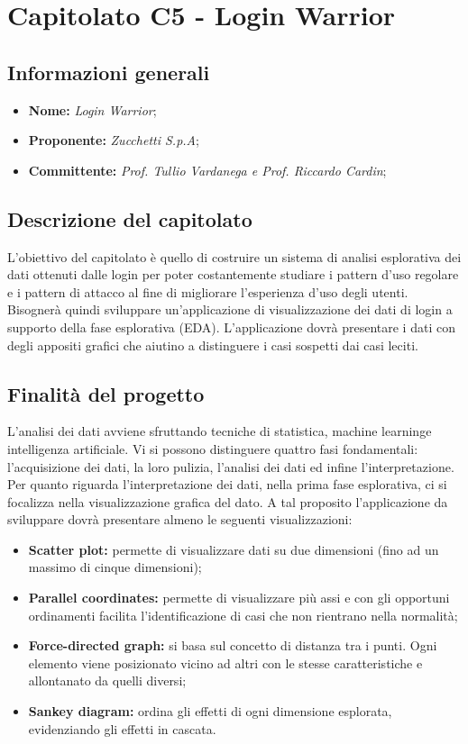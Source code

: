 \section{Capitolato C5 - Login Warrior}
\subsection{Informazioni generali}
\begin {itemize}
\item \textbf{Nome:} \textit{Login Warrior};
\item \textbf{Proponente:} \textit{Zucchetti S.p.A};
\item \textbf{Committente:} \textit{Prof. Tullio Vardanega e Prof. Riccardo Cardin};
\end{itemize}
\subsection{Descrizione del capitolato}
L’obiettivo del capitolato è quello di costruire un sistema di analisi esplorativa dei dati ottenuti dalle login per poter costantemente studiare i pattern d’uso regolare e i pattern di attacco al fine di migliorare l'esperienza d'uso degli utenti.
\\Bisognerà quindi sviluppare un’applicazione di visualizzazione dei dati di login a supporto della fase esplorativa (EDA\glo).
L’applicazione dovrà presentare i dati con degli appositi grafici che aiutino a distinguere i casi sospetti
dai casi leciti.
\subsection{Finalità del progetto}
L’analisi dei dati avviene sfruttando tecniche di statistica, machine learning\glo e intelligenza artificiale\glo.
Vi si possono distinguere quattro fasi fondamentali: l'acquisizione dei dati, la loro pulizia, l'analisi dei dati ed infine l'interpretazione.
Per quanto riguarda l'interpretazione dei dati, nella prima fase esplorativa, ci si focalizza nella visualizzazione grafica del dato.
A tal proposito l'applicazione da sviluppare dovrà presentare almeno le seguenti visualizzazioni:
\begin {itemize}
    \item \textbf{Scatter plot:} permette di visualizzare dati su due dimensioni (fino ad un massimo di cinque dimensioni);
    \item \textbf{Parallel coordinates:} permette di visualizzare più assi e con gli opportuni ordinamenti facilita l’identificazione di casi che non rientrano nella normalità;
    \item \textbf{Force-directed graph:} si basa sul concetto di distanza tra i punti. Ogni elemento viene posizionato vicino ad altri con le stesse caratteristiche e allontanato da quelli diversi;
    \item \textbf{Sankey diagram:} ordina gli effetti di ogni dimensione esplorata, evidenziando gli effetti in cascata.
\end {itemize}
